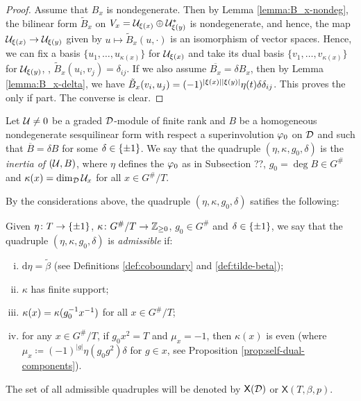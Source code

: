\begin{proof}
    Assume that $B_x$ is nondegenerate. 
    Then by Lemma \ref{lemma:B_x-nondeg}, the bilinear form $\tilde B_x$ on $V_x = \mathcal U_{\xi(x)} \oplus \mathcal U_{\xi(y)}^*$ is nondegenerate, and hence, the map $\mathcal U_{\xi(x)} \to \mathcal U_{\xi(y)}$ given by $u \mapsto \tilde B_x (u, \cdot)$  is an isomorphism of vector spaces. 
    Hence, we can fix a basis $\{u_1, \ldots, u_{\kappa(x)} \}$ for $\mathcal U_{\xi(x)}$ and take its dual basis $\{v_1, \ldots, v_{\kappa(x)} \}$ for $\mathcal U_{\xi(y)}$, \ie, $\tilde B_x (u_i, v_j) = \delta_{ij}$. 
    If we also assume $\overline{B_x} = \delta B_x$, then by Lemma \ref{lemma:B_x-delta}, we have $\tilde B_x (v_i, u_j) = (-1)^{|\xi(x)||\xi(y)|} \eta(t) \delta \delta_{ij}$. 
    This proves the only if part. 
    The converse is clear. 
\end{proof}

\begin{defi}\label{def:parameter-of-(U,B)}
    Let $\mathcal U\neq 0$ be a graded $\mathcal{D}$-module of finite rank and $B$ be a homogeneous nondegenerate sesquilinear form with respect a superinvolution $\varphi_0$ on $\mathcal{D}$ and such that $\overline{B} = \delta B$ for some $\delta \in \{ \pm 1 \}$. 
    We say that the quadruple $(\eta, \kappa, g_0, \delta)$ is the \emph{inertia of $(\mathcal U, B)$}, where $\eta$ defines the $\varphi_0$ as in Subsection ??, $g_0 = \deg B \in G^\#$ and $\kappa(x) = \dim_{\mathcal{D}} \mathcal U_x$ for all $x \in G^\#/T$. 
\end{defi}

By the considerations above, the quadruple $(\eta, \kappa, g_0, \delta)$ satifies the following: 

\begin{defi}\label{defi:X(D)}
    Given $\eta\colon T \to \{ \pm 1 \}$,
    $\kappa\colon G^\#/T \to \mathbb{Z}_{\geq 0}$, $g_0 \in G^\#$ and $\delta \in \{ \pm 1 \}$, we say that the quadruple $(\eta, \kappa, g_0, \delta)$ is \emph{admissible} if:
    \begin{enumerate}[(i)]
        \item $\mathrm{d}\eta = \tilde\beta$ (see Definitions \ref{def:coboundary} and \ref{def:tilde-beta}); \label{item:eta-is-eta}
        \item $\kappa$ has finite support; \label{item:kappa-finite-support}
        \item $\kappa(x) = \kappa(g_0^{-1} x^{-1})$ for all $x \in G^\#/T$; \label{item:kappa-duality}
        \item for any $x\in G^\#/T$, if $g_0 x^2 = T$ and $\mu_x = -1$, then $\kappa (x)$ is even (where \\$\mu_x\coloneqq (-1)^{|g|}\eta(g_0g^2)\delta$ for $g\in x$, see Proposition \ref{prop:self-dual-components}). \label{item:kappa-parity}
    \end{enumerate}
    The set of all admissible quadruples will be denoted by $\mathsf{X}(\mathcal{D})$ or $\mathsf{X}(T, \beta, p)$.
\end{defi}

